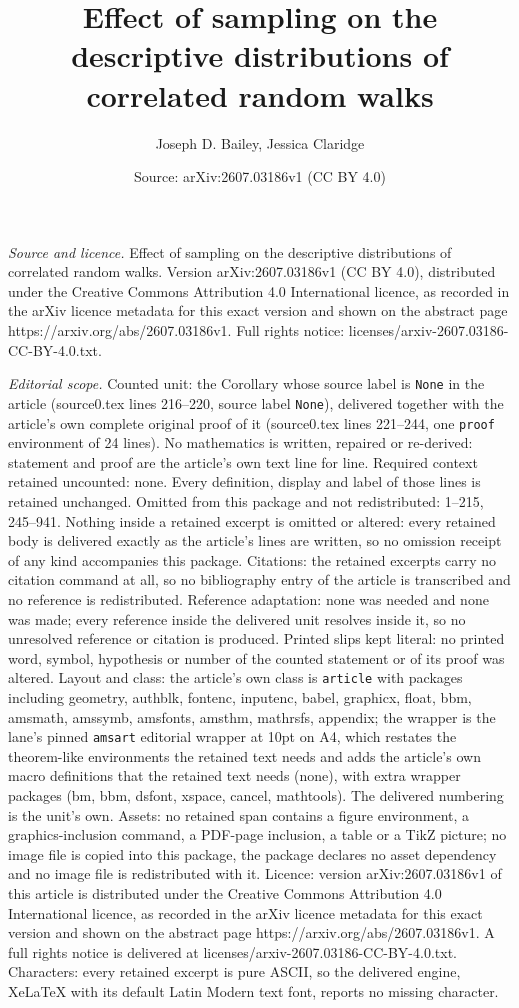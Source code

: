 \documentclass[10pt,a4paper]{amsart}
\title[Effect of sampling on the descriptive distributions of corre]{Effect of sampling on the descriptive distributions of correlated random walks}
\author{Joseph D. Bailey, Jessica Claridge}
\date{Source: arXiv:2607.03186v1 (CC BY 4.0)}
\begin{document}
\maketitle

\noindent\emph{Source and licence.} Effect of sampling on the descriptive distributions of correlated random walks. Version arXiv:2607.03186v1 (CC BY 4.0), distributed under the Creative Commons Attribution 4.0 International licence, as recorded in the arXiv licence metadata for this exact version and shown on the abstract page https://arxiv.org/abs/2607.03186v1. Full rights notice: licenses/arxiv-2607.03186-CC-BY-4.0.txt.\par\smallskip

\noindent\textit{Editorial scope.} Counted unit: the Corollary whose source label is \texttt{None} in the article (source0.tex lines 216--220, source label \texttt{None}), delivered together with the article's own complete original proof of it (source0.tex lines 221--244, one \texttt{proof} environment of 24 lines). No mathematics is written, repaired or re-derived: statement and proof are the article's own text line for line. Required context retained uncounted: none. Every definition, display and label of those lines is retained unchanged. Omitted from this package and not redistributed: 1--215, 245--941. Nothing inside a retained excerpt is omitted or altered: every retained body is delivered exactly as the article's lines are written, so no omission receipt of any kind accompanies this package. Citations: the retained excerpts carry no citation command at all, so no bibliography entry of the article is transcribed and no reference is redistributed. Reference adaptation: none was needed and none was made; every reference inside the delivered unit resolves inside it, so no unresolved reference or citation is produced. Printed slips kept literal: no printed word, symbol, hypothesis or number of the counted statement or of its proof was altered. Layout and class: the article's own class is \texttt{article} with packages including geometry, authblk, fontenc, inputenc, babel, graphicx, float, bbm, amsmath, amssymb, amsfonts, amsthm, mathrsfs, appendix; the wrapper is the lane's pinned \texttt{amsart} editorial wrapper at 10pt on A4, which restates the theorem-like environments the retained text needs and adds the article's own macro definitions that the retained text needs (none), with extra wrapper packages (bm, bbm, dsfont, xspace, cancel, mathtools). The delivered numbering is the unit's own. Assets: no retained span contains a figure environment, a graphics-inclusion command, a PDF-page inclusion, a table or a TikZ picture; no image file is copied into this package, the package declares no asset dependency and no image file is redistributed with it. Licence: version arXiv:2607.03186v1 of this article is distributed under the Creative Commons Attribution 4.0 International licence, as recorded in the arXiv licence metadata for this exact version and shown on the abstract page https://arxiv.org/abs/2607.03186v1. A full rights notice is delivered at licenses/arxiv-2607.03186-CC-BY-4.0.txt. Characters: every retained excerpt is pure ASCII, so the delivered engine, XeLaTeX with its default Latin Modern text font, reports no missing character.
\end{document}
